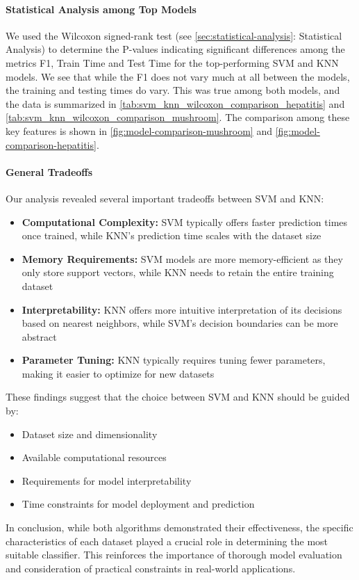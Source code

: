 \paragraph{Statistical Analysis among Top Models}
We used the Wilcoxon signed-rank test (see \autoref{sec:statistical-analysis}: Statistical Analysis) to determine the P-values indicating significant differences among the metrics F1, Train Time and Test Time for the top-performing SVM and KNN models.
We see that while the F1 does not vary much at all between the models, the training and testing times do vary. This was true among both models, and the data is summarized in \autoref{tab:svm_knn_wilcoxon_comparison_hepatitis} and \autoref{tab:svm_knn_wilcoxon_comparison_mushroom}.
The comparison among these key features is shown in \autoref{fig:model-comparison-mushroom} and \autoref{fig:model-comparison-hepatitis}.

\paragraph{General Tradeoffs}
Our analysis revealed several important tradeoffs between SVM and KNN:

\begin{itemize}
    \item \textbf{Computational Complexity:} SVM typically offers faster prediction times once trained, while KNN's prediction time scales with the dataset size
    \item \textbf{Memory Requirements:} SVM models are more memory-efficient as they only store support vectors, while KNN needs to retain the entire training dataset
    \item \textbf{Interpretability:} KNN offers more intuitive interpretation of its decisions based on nearest neighbors, while SVM's decision boundaries can be more abstract
    \item \textbf{Parameter Tuning:} KNN typically requires tuning fewer parameters, making it easier to optimize for new datasets
\end{itemize}

These findings suggest that the choice between SVM and KNN should be guided by:
\begin{itemize}
    \item Dataset size and dimensionality
    \item Available computational resources
    \item Requirements for model interpretability
    \item Time constraints for model deployment and prediction
\end{itemize}

In conclusion, while both algorithms demonstrated their effectiveness, the specific characteristics of each dataset played a crucial role in determining the most suitable classifier. This reinforces the importance of thorough model evaluation and consideration of practical constraints in real-world applications.
